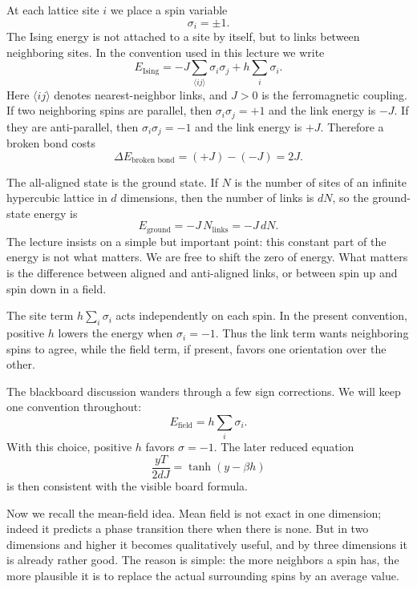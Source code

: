 At each lattice site \(i\) we place a spin variable
\begin{equation}
\sigma_i=\pm 1.
\end{equation}
The Ising energy is not attached to a site by itself, but to links between neighboring sites. In the convention used in this lecture we write
\begin{equation}
E_{\text{Ising}}=-J\sum_{\langle ij\rangle}\sigma_i\sigma_j+h\sum_i \sigma_i.
\end{equation}
Here \(\langle ij\rangle\) denotes nearest-neighbor links, and \(J>0\) is the ferromagnetic coupling. If two neighboring spins are parallel, then \(\sigma_i\sigma_j=+1\) and the link energy is \(-J\). If they are anti-parallel, then \(\sigma_i\sigma_j=-1\) and the link energy is \(+J\). Therefore a broken bond costs
\begin{equation}
\Delta E_{\text{broken bond}}=(+J)-(-J)=2J.
\end{equation}

The all-aligned state is the ground state. If \(N\) is the number of sites of an infinite hypercubic lattice in \(d\) dimensions, then the number of links is \(dN\), so the ground-state energy is
\begin{equation}
E_{\text{ground}}=-J\,N_{\text{links}}=-J\,dN.
\end{equation}
The lecture insists on a simple but important point: this constant part of the energy is not what matters. We are free to shift the zero of energy. What matters is the difference between aligned and anti-aligned links, or between spin up and spin down in a field.

The site term \(h\sum_i \sigma_i\) acts independently on each spin. In the present convention, positive \(h\) lowers the energy when \(\sigma_i=-1\). Thus the link term wants neighboring spins to agree, while the field term, if present, favors one orientation over the other.

\begin{remark}
The blackboard discussion wanders through a few sign corrections. We will keep one convention throughout:
\[
E_{\text{field}}=h\sum_i \sigma_i.
\]
With this choice, positive \(h\) favors \(\sigma=-1\). The later reduced equation
\[
\frac{yT}{2dJ}=\tanh(y-\beta h)
\]
is then consistent with the visible board formula.
\end{remark}

Now we recall the mean-field idea. Mean field is not exact in one dimension; indeed it predicts a phase transition there when there is none. But in two dimensions and higher it becomes qualitatively useful, and by three dimensions it is already rather good. The reason is simple: the more neighbors a spin has, the more plausible it is to replace the actual surrounding spins by an average value.

